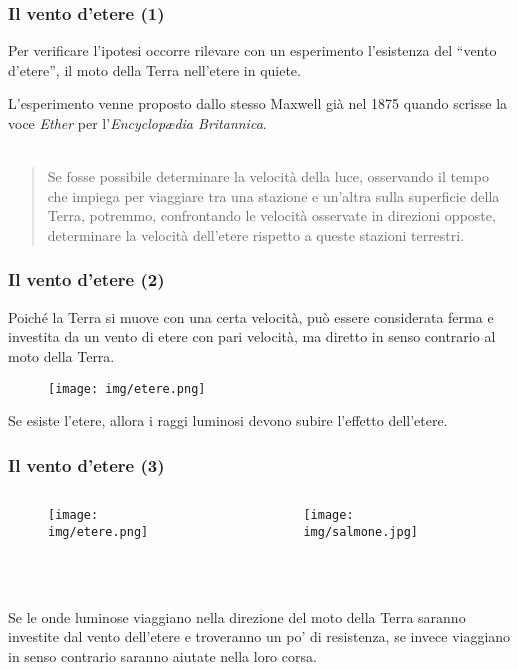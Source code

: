 \documentclass[]{beamer}
\theoremstyle{plain}
\begin{document}
\begin{frame}
  \frametitle{Il vento d'etere (1)}
  Per verificare l'ipotesi occorre rilevare con un esperimento l'esistenza del ``vento d'etere'', il moto della Terra nell'etere in quiete.\pause
  
  L'esperimento venne proposto dallo stesso Maxwell già nel 1875 quando scrisse la voce \emph{Ether} per l'\emph{Encyclop\ae dia Britannica}. \href{https://tinyurl.com/y3bbs8kg}{}\\~\\  
  \begin{quote}
    {\small Se fosse possibile determinare la velocità della luce, osservando il tempo che impiega per viaggiare tra una stazione e un'altra sulla superficie della Terra, potremmo, confrontando le velocità osservate in direzioni opposte, determinare la velocità dell'etere rispetto a queste stazioni terrestri.}
  \end{quote}
\end{frame}


\begin{frame}
  \frametitle{Il vento d'etere (2)}
  Poiché la Terra si muove con una certa velocità, può essere considerata ferma e investita da un vento di etere con pari velocità, ma diretto in senso contrario al moto della Terra.
  \begin{figure}
\texttt{[image: img/etere.png]}    
  \end{figure}
    Se esiste l'etere, allora i raggi luminosi devono subire l’effetto dell’etere.
\end{frame}

\begin{frame}
  \frametitle{Il vento d'etere (3)}
  \begin{columns}
    \begin{column}{0.5\textwidth}
      \begin{figure}
        \texttt{[image: img/etere.png]}
      \end{figure}
    \end{column}
    \begin{column}{0.5\textwidth}
      \begin{figure}
        \texttt{[image: img/salmone.jpg]}
      \end{figure}
    \end{column}
  \end{columns}
  ~\\~\\Se le onde luminose viaggiano nella direzione del moto della Terra saranno investite dal vento dell’etere e troveranno un po' di resistenza, se invece viaggiano in senso contrario saranno aiutate nella loro corsa.
\end{frame}
\end{document}
